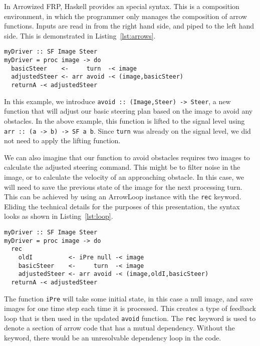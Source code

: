 In Arrowized FRP, Haskell provides an special syntax.
This is a composition environment, in which the programmer only manages the composition of arrow functions.
Inputs are read in from the right hand side, and piped to the left hand side.
This is demonstrated in Listing~\ref{lst:arrows}.

\begin{lstlisting}[float,floatplacement=h!,caption=Basic Arrowized FRP syntax,label=lst:arrows]
myDriver :: SF Image Steer
myDriver = proc image -> do
  basicSteer    <-     turn  -< image
  adjustedSteer <- arr avoid -< (image,basicSteer)
  returnA -< adjustedSteer
\end{lstlisting}

In this example, we introduce \texttt{avoid :: (Image,Steer) -> Steer}, a new function that will adjust our basic steering plan based on the image to avoid any obstacles.
In the above example, this function is lifted to the signal level using \texttt{arr :: (a -> b) -> SF a b}.
Since \texttt{turn} was already on the signal level, we did not need to apply the lifting function.

We can also imagine that our function to avoid obstacles requires two images to calculate the adjusted steering command.
This might be to filter noise in the image, or to calculate the velocity of an approaching obstacle.
In this case, we will need to save the previous state of the image for the next processing turn.
This can be achieved by using an ArrowLoop instance with the \texttt{rec} keyword.
Eliding the technical details for the purposes of this presentation, the syntax looks as shown in Listing~\ref{lst:loop}.

\begin{lstlisting}[float,caption=Using ArrowLoop to send feedback,label=lst:loop]
myDriver :: SF Image Steer
myDriver = proc image -> do
  rec
    oldI          <- iPre null -< image
    basicSteer    <-     turn  -< image
    adjustedSteer <- arr avoid -< (image,oldI,basicSteer)
  returnA -< adjustedSteer
\end{lstlisting}

The function \texttt{iPre} will take some initial state, in this case a null image, and save images for one time step each time it is processed.
This creates a type of feedback loop that is then used in the updated \texttt{avoid} function.
The \texttt{rec} keyword is used to denote a section of arrow code that has a mutual dependency.
Without the keyword, there would be an unresolvable dependency loop in the code.



